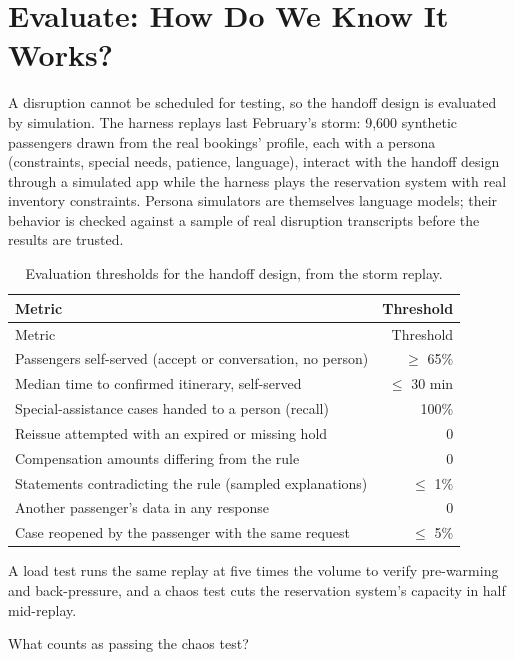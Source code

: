 \section{Evaluate: How Do We Know It Works?}
\label{sec:air-evaluate}

A disruption cannot be scheduled for testing, so the handoff design is evaluated by simulation. The harness replays last February's storm: 9{,}600 synthetic passengers drawn from the real bookings' profile, each with a persona (constraints, special needs, patience, language), interact with the handoff design through a simulated app while the harness plays the reservation system with real inventory constraints. Persona simulators are themselves language models; their behavior is checked against a sample of real disruption transcripts before the results are trusted.

\begingroup
\small
\begin{xltabular}{\textwidth}{@{}>{\raggedright\arraybackslash}X r@{}}
\caption{Evaluation thresholds for the handoff design, from the storm replay.}\label{tab:air-thresholds}\\
\toprule
{} Metric & Threshold \\
\midrule
\endfirsthead
\toprule
{} Metric & Threshold \\
\midrule
\endhead
Passengers self-served (accept or conversation, no person) & $\ge$ 65\% \\
Median time to confirmed itinerary, self-served & $\le$ 30 min \\
Special-assistance cases handed to a person (recall) & 100\% \\
Reissue attempted with an expired or missing hold & 0 \\
Compensation amounts differing from the rule & 0 \\
Statements contradicting the rule (sampled explanations) & $\le$ 1\% \\
Another passenger's data in any response & 0 \\
Case reopened by the passenger with the same request & $\le$ 5\% \\
\bottomrule
\end{xltabular}
\endgroup

A load test runs the same replay at five times the volume to verify pre-warming and back-pressure, and a chaos test cuts the reservation system's capacity in half mid-replay. \begin{quickcheck}
What counts as passing the chaos test?
\end{quickcheck}

